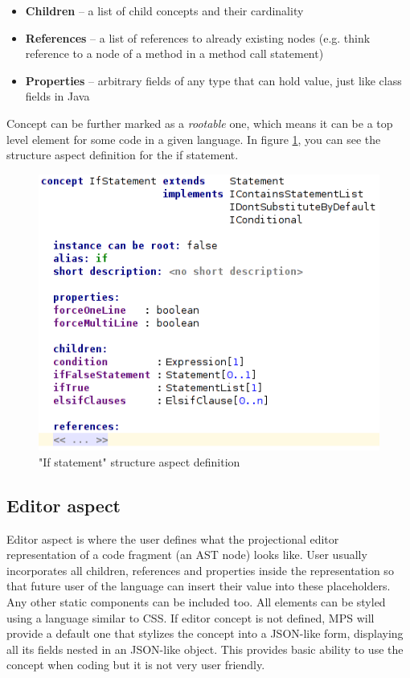 \begin{itemize}
	\item \textbf{Children} -- a list of child concepts and their cardinality
	
	\item \textbf{References} -- a list of references to already existing nodes (e.g. think reference to a node of a method in a method call statement)
	
	\item \textbf{Properties} -- arbitrary fields of any type that can hold value, just like class fields in Java
\end{itemize}

Concept can be further marked as a \textit{rootable} one, which means it can be a top level element for some code in a given language. In figure \ref{fig:if_statement_structure}, you can see the structure aspect definition for the if statement.

\begin{figure}[h]
	\centering
	\includegraphics[scale=0.75]{./img/if_statement_structure.png}
	\caption{"If statement" structure aspect definition}
	\label{fig:if_statement_structure}
\end{figure}

\subsection{Editor aspect}
Editor aspect is where the user defines what the projectional editor representation of a code fragment (an AST node) looks like. User usually incorporates all children, references and properties inside the representation so that future user of the language can insert their value into these placeholders. Any other static components can be included too. All elements can be styled using a language similar to CSS. If editor concept is not defined, MPS will provide a default one that stylizes the concept into a JSON-like form, displaying all its fields nested in an JSON-like object. This provides basic ability to use the concept when coding but it is not very user friendly.


